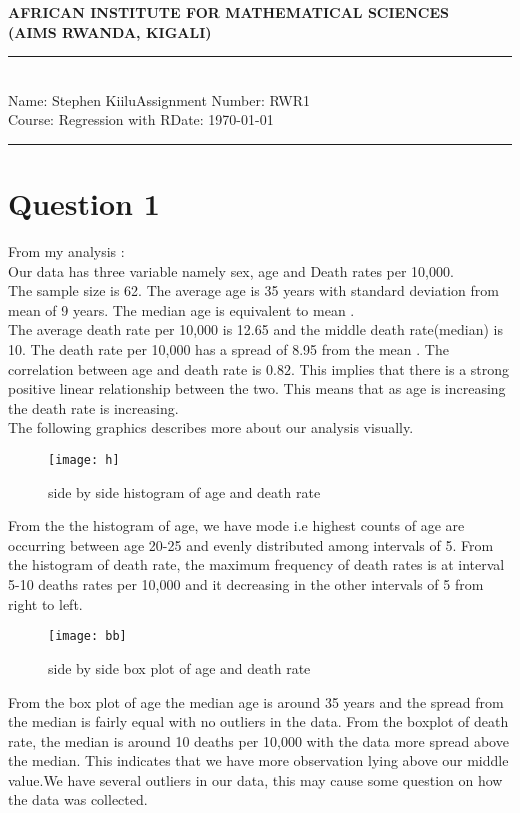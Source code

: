\documentclass[12pt,a4paper]{article}
\newcommand{\student}{Stephen Kiilu}
\newcommand{\course}{Regression with R}
\newcommand{\assignment}{RWR1}
\begin{document}
\thispagestyle{empty}
\begin{center}
\textbf{AFRICAN INSTITUTE FOR MATHEMATICAL SCIENCES \\[0.5cm]
(AIMS RWANDA, KIGALI)}
\vspace{1.0cm}
\end{center}

\noindent
\rule{17cm}{0.2cm}\\[0.3cm]
Name: \student \hfill Assignment Number: \assignment\\[0.1cm]
Course: \course \hfill Date: \today\\
\rule{17cm}{0.05cm}
\vspace{1.0cm}

\section*{Question 1}
From my analysis :\\
Our data has three variable namely sex, age and Death rates per 10,000.\\
The sample size is 62.
The average age is 35 years with standard deviation from mean of 9 years. The median age is equivalent to mean .\\
The average death rate per 10,000 is 12.65 and the middle death rate(median) is 10. The death rate per 10,000 has a spread of 8.95 from the mean .
The correlation between age and death rate is $0.82$. This implies that there is a strong positive linear relationship between the two. This means that as age is increasing the death rate is increasing.\\
The following graphics describes more about our analysis visually. 
\begin{figure}[H]
\texttt{[image: h]}
\centering
\caption{side by side histogram of age and death rate}
\end{figure}
From the the histogram of age, we have mode i.e highest counts of age are occurring between age 20-25 and evenly distributed among intervals of 5. From the histogram of death rate, the maximum frequency of death rates is at interval 5-10 deaths rates per 10,000 and it decreasing in the other intervals of 5 from right to left.
\begin{figure}[H]
\texttt{[image: bb]}
\centering
\caption{side by side box plot of age and death rate}
\end{figure}
From the box plot of age the median age is around 35 years and the spread from the median is fairly equal with no outliers in the data. From the boxplot of death rate, the median is around 10 deaths per 10,000 with the data more spread above the median. This indicates that we have more observation lying above our middle value.We have several outliers in our data, this may cause some question on how the data was collected. 
\end{document}
